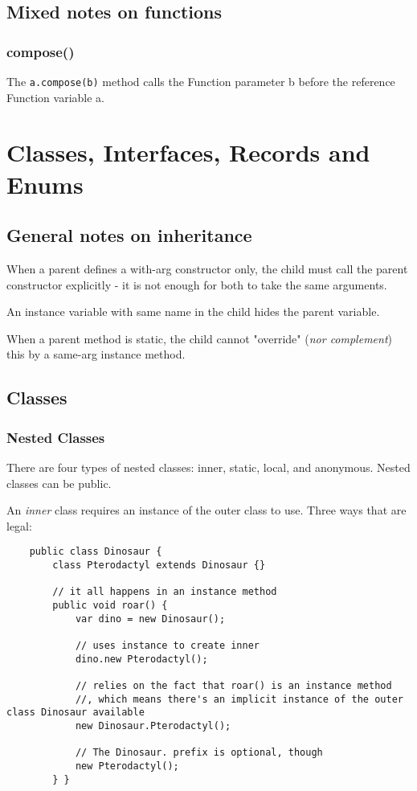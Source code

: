 \documentclass{scrartcl}
\begin{document}
\subsection{Mixed notes on functions}
\subsubsection{compose()}

    The \lstinline{a.compose(b)} method calls the Function parameter b before the reference Function variable a.


\section{Classes, Interfaces, Records and Enums}
\subsection{General notes on inheritance}

    When a parent defines a with-arg constructor only, the child must call the parent constructor explicitly - it is not enough for both to take the same arguments.

    An instance variable with same name in the child hides the parent variable.

    When a parent method is static, the child cannot "override" (\textit{nor complement}) this by a same-arg instance method.

\subsection{Classes}
\subsubsection{Nested Classes}

    There are four types of nested classes: inner, static, local, and anonymous.
    Nested classes can be public.

    An \textit{inner} class requires an instance of the outer class to use.
    Three ways that are legal:

    \begin{lstlisting}
    public class Dinosaur {
        class Pterodactyl extends Dinosaur {}

        // it all happens in an instance method
        public void roar() {
            var dino = new Dinosaur();

            // uses instance to create inner
            dino.new Pterodactyl();

            // relies on the fact that roar() is an instance method
            //, which means there's an implicit instance of the outer class Dinosaur available
            new Dinosaur.Pterodactyl();

            // The Dinosaur. prefix is optional, though
            new Pterodactyl();
        } }
    \end{lstlisting}
\end{document}
